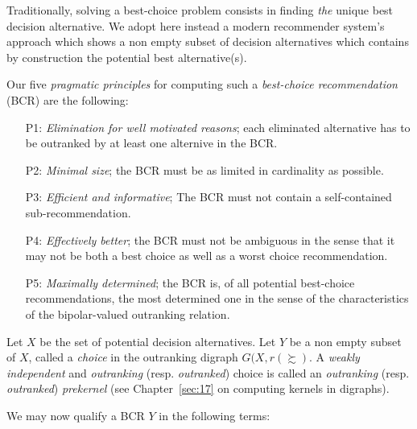 Traditionally, solving a best-choice problem consists in finding \emph{the} unique best decision alternative. We adopt here instead a modern recommender system’s approach which shows a non empty subset of decision alternatives which contains by construction the potential best alternative(s).

Our five \emph{pragmatic principles} for computing such a \emph{best-choice recommendation} (BCR) are the following:

\begin{itemize}[leftmargin=1cm,listparindent=0em,nosep]
\item [P1:] \emph{Elimination for well motivated reasons}; each eliminated alternative has to be outranked by at least one alternive in the BCR.
\item [P2:] \emph{Minimal size}; the BCR must be as limited in cardinality as possible.
\item [P3:] \emph{Efficient and informative}; The BCR must not contain a self-contained sub-recommendation.
\item [P4:] \emph{Effectively better}; the BCR must not be ambiguous in the sense that it may not be both a best choice as well as a worst choice recommendation.
\item [P5:] \emph{Maximally determined}; the BCR is, of all potential best-choice recommendations, the most determined one in the sense of the characteristics of the bipolar-valued outranking relation.
\end{itemize}

Let $X$ be the set of potential decision alternatives. Let $Y$ be a non empty subset of $X$, called a \emph{choice} in the outranking digraph $G(X,r(\succsim )$. A \emph{weakly independent} and \emph{outranking} (resp. \emph{outranked}) choice is called an \emph{outranking} (resp. \emph{outranked}) \emph{prekernel} (see Chapter~\ref{sec:17} on computing kernels in digraphs).

We may now qualify a BCR $Y$ in the following terms:

